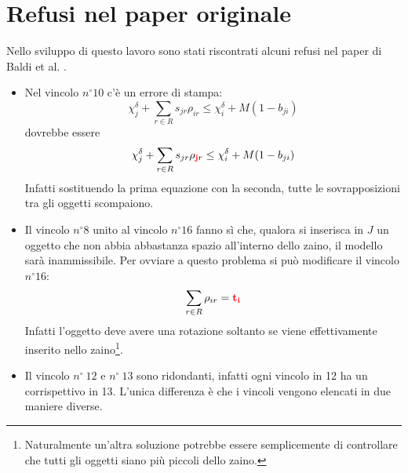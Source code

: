 \documentclass{scrartcl}
\begin{document}
\section{Refusi nel paper originale}
Nello sviluppo di questo lavoro sono stati riscontrati alcuni refusi nel paper di Baldi et al. \cite{Baldi20129802}.
\begin{itemize}
	\item Nel vincolo $n^\circ 10$ c'è un errore di stampa:
	$$
	\chi_j^\delta + \sum_{r\in R} s_{jr}\rho_{ir} \leq \chi_i^\delta + M(1-b_{ji})
	$$
	dovrebbe essere 
	$$
	\chi_j^\delta + \sum_{r\in R} s_{jr}\rho_{\mathbf{\color{red}j}r} \leq \chi_i^\delta + M(1-b_{ji})
	$$
	Infatti sostituendo la prima equazione con la seconda, tutte le sovrapposizioni tra gli oggetti scompaiono.
	\item Il vincolo $n^\circ 8$ unito al vincolo $n^\circ 16$ fanno sì che, qualora si inserisca in $J$ un oggetto che non abbia abbastanza spazio all'interno dello zaino, il modello sarà inammissibile. Per ovviare a questo problema si può modificare il vincolo $n^\circ 16$:
	$$
	\sum_{r \in R} \rho_{ir} = \color{red}\mathbf{t_i}
	$$
	Infatti l'oggetto deve avere una rotazione soltanto se viene effettivamente inserito nello zaino\footnote{ 
	Naturalmente un'altra soluzione potrebbe essere semplicemente di controllare che tutti gli oggetti siano più piccoli dello zaino.}. 
	\item Il vincolo $n^\circ\ 12$ e $n^\circ\ 13$ sono ridondanti, infatti ogni vincolo in 12 ha un corrispettivo in 13. L'unica differenza è che i vincoli vengono elencati in due maniere diverse. 
\end{itemize}




\end{document}
